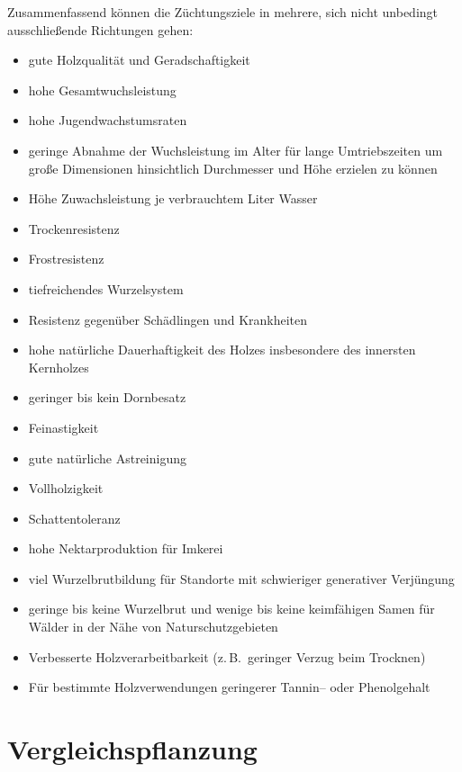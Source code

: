 \documentclass[twocolumn]{scrartcl}
\begin{document}
Zusammenfassend können die Züchtungsziele in mehrere, sich nicht unbedingt
ausschließende Richtungen gehen:

\begin{itemize}
  \item gute Holzqualität und Geradschaftigkeit
  \item hohe Gesamtwuchsleistung
  \item hohe Jugendwachstumsraten
  \item geringe Abnahme der Wuchsleistung im Alter für lange Umtriebszeiten um große Dimensionen hinsichtlich Durchmesser und Höhe erzielen zu können
  \item Höhe Zuwachsleistung je verbrauchtem Liter Wasser
  \item Trockenresistenz
  \item Frostresistenz
  \item tiefreichendes Wurzelsystem
  \item Resistenz gegenüber Schädlingen und Krankheiten
  \item hohe natürliche Dauerhaftigkeit des Holzes insbesondere des innersten Kernholzes
  \item geringer bis kein Dornbesatz
  \item Feinastigkeit
  \item gute natürliche Astreinigung
  \item Vollholzigkeit
  \item Schattentoleranz
  \item hohe Nektarproduktion für Imkerei
  \item viel Wurzelbrutbildung für Standorte mit schwieriger generativer Verjüngung
  \item geringe bis keine Wurzelbrut und wenige bis keine keimfähigen Samen für Wälder in der Nähe von Naturschutzgebieten
  \item Verbesserte Holzverarbeitbarkeit (z.\,B.\ geringer Verzug beim Trocknen)
  \item Für bestimmte Holzverwendungen geringerer Tannin-- oder Phenolgehalt 
\end{itemize}

\section{Vergleichspflanzung}
\end{document}
